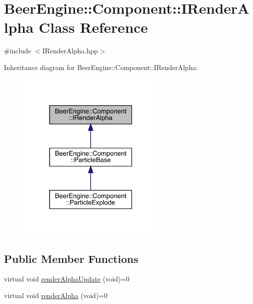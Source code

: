 \hypertarget{class_beer_engine_1_1_component_1_1_i_render_alpha}{}\section{Beer\+Engine\+:\+:Component\+:\+:I\+Render\+Alpha Class Reference}
\label{class_beer_engine_1_1_component_1_1_i_render_alpha}


{\ttfamily \#include $<$I\+Render\+Alpha.\+hpp$>$}



Inheritance diagram for Beer\+Engine\+:\+:Component\+:\+:I\+Render\+Alpha\+:
\nopagebreak
\begin{figure}[H]
\begin{center}
\leavevmode
\includegraphics[width=206pt]{class_beer_engine_1_1_component_1_1_i_render_alpha__inherit__graph}
\end{center}
\end{figure}
\subsection*{Public Member Functions}
\begin{DoxyCompactItemize}
\item 
virtual void \mbox{\hyperlink{class_beer_engine_1_1_component_1_1_i_render_alpha_ad0fd47a02cc63152b25dbfdb4b2639fa}{render\+Alpha\+Update}} (void)=0
\item 
virtual void \mbox{\hyperlink{class_beer_engine_1_1_component_1_1_i_render_alpha_a3797df36149a8a8416ef24406923f068}{render\+Alpha}} (void)=0
\end{DoxyCompactItemize}


